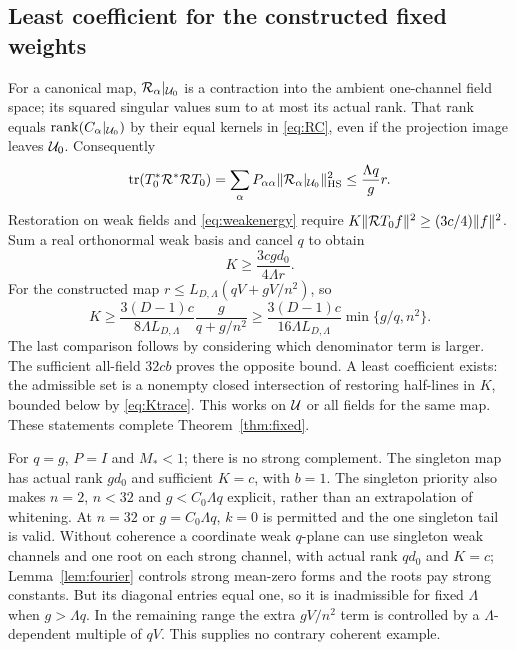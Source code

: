 \subsection{Least coefficient for the constructed fixed weights}
For a canonical map, $\mathcal R_\alpha|_{\mathcal U_0}$ is a contraction into the
ambient one-channel field space; its squared singular values sum to at most
its actual rank. That rank equals $\operatorname{rank}(C_\alpha|_{\mathcal U_0})$ by their equal
kernels in \eqref{eq:RC}, even if the projection image leaves $\mathcal U_0$.
Consequently
\[
 \operatorname{tr}(T_0^*\mathcal R^*\mathcal RT_0)
 =\sum_\alpha P_{\alpha\alpha}
             \lVert \mathcal R_\alpha|_{\mathcal U_0}\rVert_{\rm HS}^2
 \leq\frac{\Lambda q}{g}r.
\]
Restoration on weak fields and \eqref{eq:weakenergy} require
$K\lVert \mathcal RT_0f\rVert^2\geq(3c/4)\lVert f\rVert^2$.
Sum a real orthonormal weak basis and cancel $q$ to obtain
\begin{equation}\label{eq:Ktrace}
 K\geq\frac{3cgd_0}{4\Lambda r}.
\end{equation}
For the constructed map $r\leq L_{D,\Lambda}(qV+gV/n^2)$, so
\[
 K\geq\frac{3(D-1)c}{8\Lambda L_{D,\Lambda}}
          \frac g{q+g/n^2}
 \geq\frac{3(D-1)c}{16\Lambda L_{D,\Lambda}}\min\{g/q,n^2\}.
\]
The last comparison follows by considering which denominator term is larger.
The sufficient all-field $32cb$ proves the opposite bound. A least coefficient
exists: the admissible set is a nonempty closed intersection of restoring
half-lines in $K$, bounded below by \eqref{eq:Ktrace}. This works on $\mathcal U$
or all fields for the same map. These statements complete
Theorem~\ref{thm:fixed}.

\begin{remark}\label{rem:endpoints}
For $q=g$, $P=I$ and $M_*<1$; there is no strong complement. The singleton
map has actual rank $gd_0$ and sufficient $K=c$, with $b=1$. The singleton
priority also makes $n=2$, $n<32$ and $g<C_0\Lambda q$ explicit, rather than
an extrapolation of whitening. At $n=32$ or $g=C_0\Lambda q$, $k=0$ is
permitted and the one singleton tail is valid.
Without coherence a coordinate weak $q$-plane can use singleton weak channels
and one root on each strong channel, with actual rank $qd_0$ and $K=c$;
Lemma~\ref{lem:fourier} controls strong mean-zero forms and the roots pay
strong constants. But its diagonal entries equal one, so it is inadmissible
for fixed $\Lambda$ when $g>\Lambda q$. In the remaining range the extra
$gV/n^2$ term is controlled by a $\Lambda$-dependent multiple of $qV$.
This supplies no contrary coherent example.
\end{remark}
